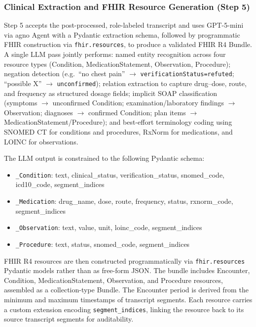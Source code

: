 \subsubsection{Clinical Extraction and FHIR Resource Generation (Step 5)}

Step 5 accepts the post-processed, role-labeled transcript and uses GPT-5-mini via agno Agent with a Pydantic extraction schema, followed by programmatic FHIR construction via \texttt{fhir.resources}, to produce a validated FHIR R4 Bundle. A single LLM pass jointly performs: named entity recognition across four resource types (Condition, MedicationStatement, Observation, Procedure); negation detection (e.g.\ ``no chest pain'' $\rightarrow$ \texttt{verificationStatus=refuted}; ``possible X'' $\rightarrow$ \texttt{unconfirmed}); relation extraction to capture drug–dose, route, and frequency as structured dosage fields; implicit SOAP classification (symptoms $\rightarrow$ unconfirmed Condition; examination/laboratory findings $\rightarrow$ Observation; diagnoses $\rightarrow$ confirmed Condition; plan items $\rightarrow$ MedicationStatement/Procedure); and best-effort terminology coding using SNOMED CT for conditions and procedures, RxNorm for medications, and LOINC for observations.

The LLM output is constrained to the following Pydantic schema:
\begin{itemize}
  \item \texttt{\_Condition}: text, clinical\_status, verification\_status, snomed\_code, icd10\_code, segment\_indices
  \item \texttt{\_Medication}: drug\_name, dose, route, frequency, status, rxnorm\_code, segment\_indices
  \item \texttt{\_Observation}: text, value, unit, loinc\_code, segment\_indices
  \item \texttt{\_Procedure}: text, status, snomed\_code, segment\_indices
\end{itemize}

FHIR R4 resources are then constructed programmatically via \texttt{fhir.resources} Pydantic models rather than as free-form JSON. The bundle includes Encounter, Condition, MedicationStatement, Observation, and Procedure resources, assembled as a collection-type Bundle. The Encounter period is derived from the minimum and maximum timestamps of transcript segments. Each resource carries a custom extension encoding \texttt{segment\_indices}, linking the resource back to its source transcript segments for auditability.

